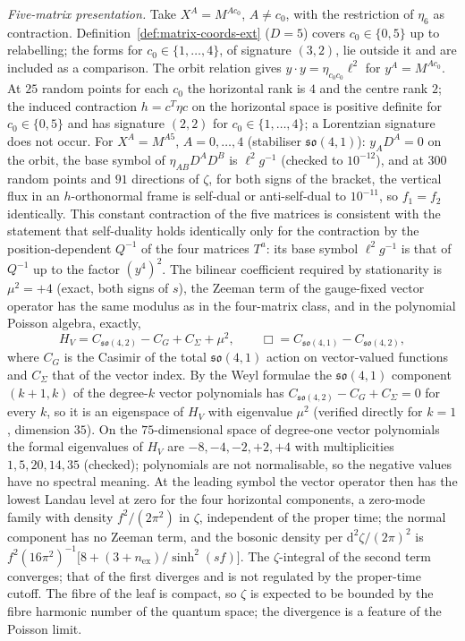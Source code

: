 \emph{Five-matrix presentation.} Take \(X^A=M^{Ac_0}\), \(A\ne c_0\), with the restriction of \(\eta_6\) as contraction. Definition~\ref{def:matrix-coords-ext} (\(D=5\)) covers \(c_0\in\{0,5\}\) up to relabelling; the forms for \(c_0\in\{1,\dots,4\}\), of signature \((3,2)\), lie outside it and are included as a comparison. The orbit relation gives \(y\cdot y=\eta_{c_0c_0}\ell^2\) for \(y^A=M^{Ac_0}\). At \(25\) random points for each \(c_0\) the horizontal rank is \(4\) and the centre rank \(2\); the induced contraction \(h=c^{T}\eta c\) on the horizontal space is positive definite for \(c_0\in\{0,5\}\) and has signature \((2,2)\) for \(c_0\in\{1,\dots,4\}\); a Lorentzian signature does not occur. For \(X^A=M^{A5}\), \(A=0,\dots,4\) (stabiliser \(\mathfrak{so}(4,1)\)): \(y_AD^A=0\) on the orbit, the base symbol of \(\eta_{AB}D^AD^B\) is \(\ell^2g^{-1}\) (checked to \(10^{-12}\)), and at \(300\) random points and \(91\) directions of \(\zeta\), for both signs of the bracket, the vertical flux in an \(h\)-orthonormal frame is self-dual or anti-self-dual to \(10^{-11}\), so \(f_1=f_2\) identically. This constant contraction of the five matrices is consistent with the statement that self-duality holds identically only for the contraction by the position-dependent \(Q^{-1}\) of the four matrices \(T^a\): its base symbol \(\ell^2g^{-1}\) is that of \(Q^{-1}\) up to the factor \((y^4)^2\). The bilinear coefficient required by stationarity is \(\mu^2=+4\) (exact, both signs of \(s\)), the Zeeman term of the gauge-fixed vector operator has the same modulus as in the four-matrix class, and in the polynomial Poisson algebra, exactly,
\[
H_V=C_{\mathfrak{so}(4,2)}-C_{G}+C_{\Sigma}+\mu^2,\qquad \Box=C_{\mathfrak{so}(4,1)}-C_{\mathfrak{so}(4,2)},
\]
where \(C_G\) is the Casimir of the total \(\mathfrak{so}(4,1)\) action on vector-valued functions and \(C_\Sigma\) that of the vector index. By the Weyl formulae the \(\mathfrak{so}(4,1)\) component \((k+1,k)\) of the degree-\(k\) vector polynomials has \(C_{\mathfrak{so}(4,2)}-C_G+C_\Sigma=0\) for every \(k\), so it is an eigenspace of \(H_V\) with eigenvalue \(\mu^2\) (verified directly for \(k=1\), dimension \(35\)). On the \(75\)-dimensional space of degree-one vector polynomials the formal eigenvalues of \(H_V\) are \(-8,-4,-2,+2,+4\) with multiplicities \(1,5,20,14,35\) (checked); polynomials are not normalisable, so the negative values have no spectral meaning. At the leading symbol the vector operator then has the lowest Landau level at zero for the four horizontal components, a zero-mode family with density \(f^2/(2\pi^2)\) in \(\zeta\), independent of the proper time; the normal component has no Zeeman term, and the bosonic density per \(\mathrm d^2\zeta/(2\pi)^2\) is \(f^2(16\pi^2)^{-1}\bigl[8+(3+n_{\mathrm{ex}})/\sinh^2(sf)\bigr]\). The \(\zeta\)-integral of the second term converges; that of the first diverges and is not regulated by the proper-time cutoff. The fibre of the leaf is compact, so \(\zeta\) is expected to be bounded by the fibre harmonic number of the quantum space; the divergence is a feature of the Poisson limit.

